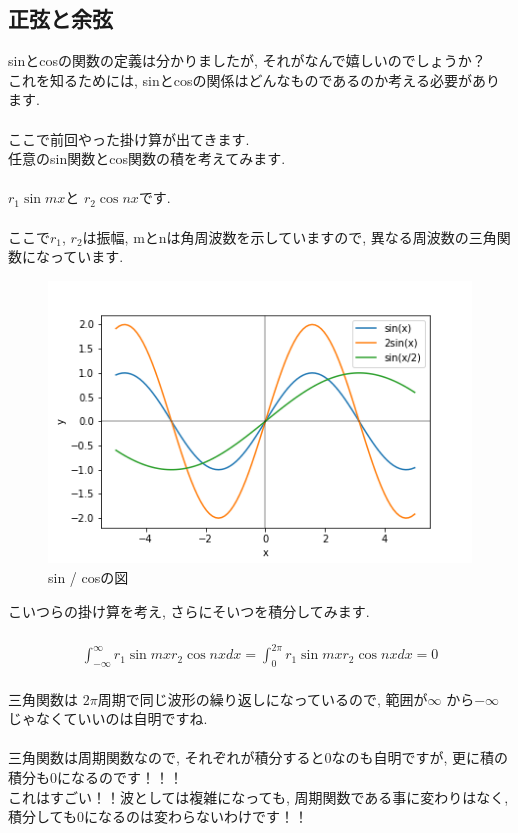 \documentclass[11pt,a4paper]{jreport}
\begin{document}
\subsection{正弦と余弦}
sinとcosの関数の定義は分かりましたが, それがなんで嬉しいのでしょうか？\\
これを知るためには, sinとcosの関係はどんなものであるのか考える必要があります.\\
\\
ここで前回やった掛け算が出てきます. \\
任意のsin関数とcos関数の積を考えてみます.\\
\\
$r_1\sin mx $と $r_2\cos nx $です.\\
\\
ここで$r_1$, $r_2$は振幅, mとnは角周波数を示していますので, 異なる周波数の三角関数になっています.\\

\begin{figure}[H]
\label{im:sincos}
  \centering
  \includegraphics[width=120mm,bb=0 0 432 288]{figures/sines.png}
  \caption{sin / cosの図}
\end{figure}

こいつらの掛け算を考え, さらにそいつを積分してみます.\\
\\
\begin{eqnarray}
  \int^\infty_{-\infty} r_1\sin mx r_2\cos nx dx = \int^{2\pi}_0 r_1\sin mx r_2\cos nx dx = 0
\end{eqnarray}
\\
三角関数は $2\pi$周期で同じ波形の繰り返しになっているので, 範囲が$\infty$ から$-\infty$じゃなくていいのは自明ですね.\\
\\
三角関数は周期関数なので, それぞれが積分すると0なのも自明ですが, 更に積の積分も0になるのです！！！\\
これはすごい！！波としては複雑になっても, 周期関数である事に変わりはなく, 積分しても0になるのは変わらないわけです！！\\
\end{document}
